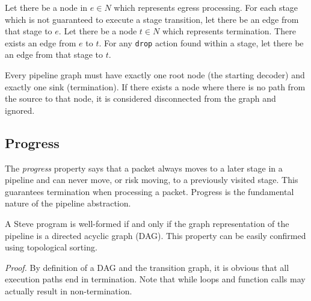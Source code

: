 Let there be a node in $e \in N$ which represents egress processing. For each stage which is not guaranteed to execute a stage transition, let there be an edge from that stage to $e$. Let there be a node $t \in N$ which represents termination. There exists an edge from $e$ to $t$. For any \texttt{drop} action found within a stage, let there be an edge from that stage to $t$. 

Every pipeline graph must have exactly one root node (the starting decoder) and exactly one sink (termination).
If there exists a node where there is no path from the source to that node, it is
considered disconnected from the graph and ignored.

\subsection{Progress} \label{guide:progress}

The \textit{progress} property says that a packet always moves to a later stage in a pipeline and can never move, or risk moving, to a previously visited stage.
This guarantees termination when processing a packet.
Progress is the fundamental nature of the pipeline abstraction. 

A Steve program is well-formed if and only if the graph representation of the pipeline is a directed acyclic graph (DAG). This property can be easily confirmed using topological sorting.

\textit{Proof.} By definition of a DAG and the transition graph, it is obvious that all execution paths end in termination. Note that while loops and function calls may actually result in non-termination.

%
%

